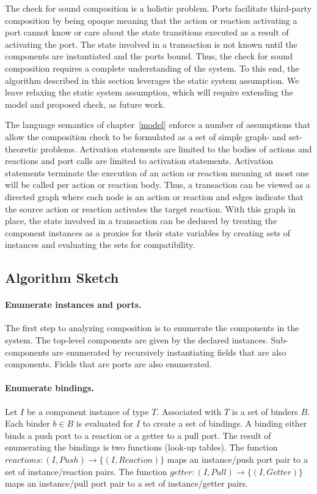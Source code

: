 The check for sound composition is a holistic problem.
Ports facilitate third-party composition by being opaque meaning that the action or reaction activating a port cannot know or care about the state transitions executed as a result of activating the port.
The state involved in a transaction is not known until the components are instantiated and the ports bound.
Thus, the check for sound composition requires a complete understanding of the system.
To this end, the algorithm described in this section leverages the static system assumption.
We leave relaxing the static system assumption, which will require extending the model and proposed check, as future work.

The language semantics of chapter~\ref{model} enforce a number of assumptions that allow the composition check to be formulated as a set of simple graph- and set-theoretic problems.
Activation statements are limited to the bodies of actions and reactions and port calls are limited to activation statements.
Activation statements terminate the execution of an action or reaction meaning at most one will be called per action or reaction body.
Thus, a transaction can be viewed as a directed graph where each node is an action or reaction and edges indicate that the source action or reaction activates the target reaction.
With this graph in place, the state involved in a transaction can be deduced by treating the component instances as a proxies for their state variables by creating sets of instances and evaluating the sets for compatibility.

\subsection{Algorithm Sketch}

\paragraph{Enumerate instances and ports.}
The first step to analyzing composition is to enumerate the components in the system.
The top-level components are given by the declared instances.
Sub-components are enumerated by recursively instantiating fields that are also components.
Fields that are ports are also enumerated.

\paragraph{Enumerate bindings.}
Let $I$ be a component instance of type $T$.
Associated with $T$ is a set of binders $B$.
Each binder $b \in B$ is evaluated for $I$ to create a set of bindings.
A binding either binds a push port to a reaction or a getter to a pull port.
The result of enumerating the bindings is two functions (look-up tables).
The function $reactions: (I,Push) \to \{(I,Reaction)\}$ maps an instance/push port pair to a set of instance/reaction pairs.
The function $getter: (I,Pull) \to \{(I,Getter)\}$ maps an instance/pull port pair to a set of instance/getter pairs.

